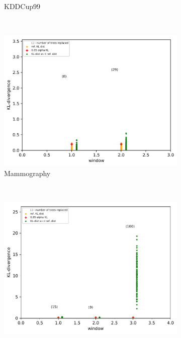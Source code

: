 \documentclass{article} %
\begin{document}
\begin{figure}
\begin{subfigure}[b]{0.23\textwidth}
    	\caption{KDDCup99}
    	\label{fig:concept_drift_kddcup}
    \end{subfigure} \\
    \begin{subfigure}[b]{0.23\textwidth}
    	\includegraphics[width=\textwidth]{figures/test_concept_drift_mammography}
    	\caption{Mammography}
    	\label{fig:concept_drift_mammography}
    \end{subfigure}
    ~ %
    \begin{subfigure}[b]{0.23\textwidth}
    	\includegraphics[width=\textwidth]{figures/test_concept_drift_shuttle_1v23567}

\end{subfigure}
\end{figure}
\end{document}
